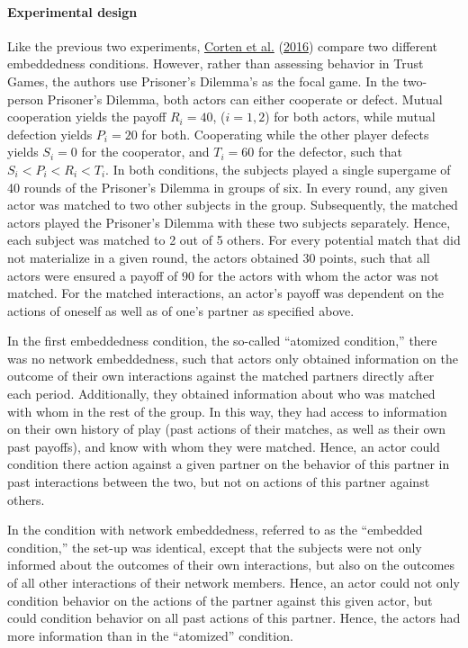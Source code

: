 \documentclass[
  11pt,
]{article}
\begin{document}
\hypertarget{experimental-design-3}{%
\paragraph{Experimental design}\label{experimental-design-3}}

Like the previous two experiments, \protect\hyperlink{ref-corten_etal_reputation_2016}{Corten et al.} (\protect\hyperlink{ref-corten_etal_reputation_2016}{2016}) compare two different embeddedness conditions. However, rather than assessing behavior in Trust Games, the authors use Prisoner's Dilemma's as the focal game. In the two-person Prisoner's Dilemma, both actors can either cooperate or defect. Mutual cooperation yields the payoff \(R_i = 40\), (\(i = 1,2\)) for both actors, while mutual defection yields \(P_i = 20\) for both. Cooperating while the other player defects yields \(S_i = 0\) for the cooperator, and \(T_i = 60\) for the defector, such that \(S_i < P_i < R_i < T_i\). In both conditions, the subjects played a single supergame of 40 rounds of the Prisoner's Dilemma in groups of six. In every round, any given actor was matched to two other subjects in the group. Subsequently, the matched actors played the Prisoner's Dilemma with these two subjects separately. Hence, each subject was matched to 2 out of 5 others. For every potential match that did not materialize in a given round, the actors obtained 30 points, such that all actors were ensured a payoff of \(90\) for the actors with whom the actor was not matched. For the matched interactions, an actor's payoff was dependent on the actions of oneself as well as of one's partner as specified above.

In the first embeddedness condition, the so-called ``atomized condition,'' there was no network embeddedness, such that actors only obtained information on the outcome of their own interactions against the matched partners directly after each period. Additionally, they obtained information about who was matched with whom in the rest of the group. In this way, they had access to information on their own history of play (past actions of their matches, as well as their own past payoffs), and know with whom they were matched. Hence, an actor could condition there action against a given partner on the behavior of this partner in past interactions between the two, but not on actions of this partner against others.

In the condition with network embeddedness, referred to as the ``embedded condition,'' the set-up was identical, except that the subjects were not only informed about the outcomes of their own interactions, but also on the outcomes of all other interactions of their network members.
Hence, an actor could not only condition behavior on the actions of the partner against this given actor, but could condition behavior on all past actions of this partner. Hence, the actors had more information than in the ``atomized'' condition.
\end{document}
